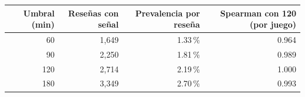 \begin{tabular}{rrrr}
\toprule
Umbral (min) & Reseñas con señal & Prevalencia por reseña & Spearman con 120 (por juego) \\
\midrule
60 & 1,649 & 1.33\,\% & 0.964 \\
90 & 2,250 & 1.81\,\% & 0.989 \\
120 & 2,714 & 2.19\,\% & 1.000 \\
180 & 3,349 & 2.70\,\% & 0.993 \\
\bottomrule
\end{tabular}
